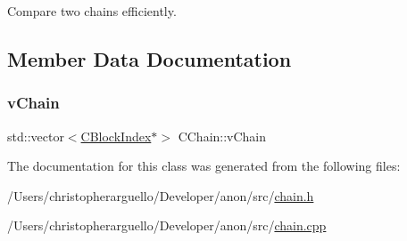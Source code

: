 Compare two chains efficiently. 

\subsection{Member Data Documentation}
\mbox{\label{class_c_chain_adc8fa3eb698fb5985c7b39daf6bbf708}} 
\subsubsection{\texorpdfstring{v\+Chain}{vChain}}
{\footnotesize\ttfamily std\+::vector$<$\mbox{\hyperlink{class_c_block_index}{C\+Block\+Index}}$\ast$$>$ C\+Chain\+::v\+Chain\hspace{0.3cm}{\ttfamily [private]}}



The documentation for this class was generated from the following files\+:\begin{DoxyCompactItemize}
\item 
/\+Users/christopherarguello/\+Developer/anon/src/\mbox{\hyperlink{chain_8h}{chain.\+h}}\item 
/\+Users/christopherarguello/\+Developer/anon/src/\mbox{\hyperlink{chain_8cpp}{chain.\+cpp}}\end{DoxyCompactItemize}
